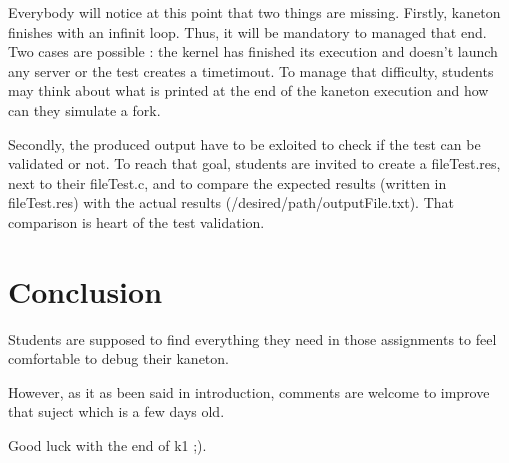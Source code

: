 Everybody will notice at this point that two things are missing. Firstly, kaneton finishes with an infinit loop. Thus, it will be mandatory to managed that end. Two cases are possible : the kernel has finished its execution and doesn't launch any server or the test creates a timetimout. To manage that difficulty, students may think about what is printed at the end of the kaneton execution and how can they simulate a fork.

Secondly, the produced output have to be exloited to check if the test can be validated or not. To reach that goal, students are invited to create a fileTest.res, next to their fileTest.c, and to compare the expected results (written in fileTest.res) with the actual results (/desired/path/outputFile.txt). That comparison is heart of the test validation.

\chapter{Conclusion}
Students are supposed to find everything they need in those assignments to feel comfortable to debug their kaneton.

However, as it as been said in introduction, comments are welcome to improve that suject which is a few days old.

Good luck with the end of k1 ;).




